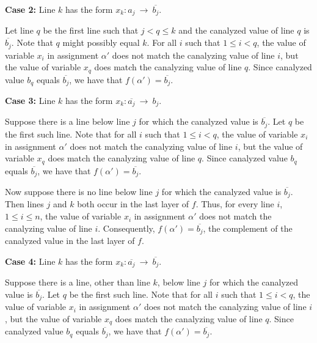 \medskip

\noindent
{\bf Case 2:} Line $k$ has the form  $x_k : a_j ~\longrightarrow~ \overline{b_j}$.  

\smallskip

Let line $q$ be the first line such that $j < q \leq k$ and the canalyzed
value of line $q$ is $\overline{b_j}$.  Note that $q$ might possibly
equal $k$.  For all $i$ such that $1 \leq i < q$, the value of
variable $x_i$ in assignment $\alpha'$ does not match the canalyzing
value of line $i$, but the value of variable $x_q$ does match the
canalyzing value of line $q$.  Since canalyzed value $b_q$ equals
$\overline{b_j}$, we have that $f(\alpha') = \overline{b_j}$.

\medskip

\noindent
{\bf Case 3:} Line $k$ has the form $x_k : \overline{a_j} ~\longrightarrow~ b_j$.  

\smallskip

Suppose there is a line below line $j$ for which the canalyzed value is
$\overline{b_j}$.  Let $q$ be the first such line.  Note that for
all $i$ such that $1 \leq i < q$, the value of variable $x_i$ in
assignment $\alpha'$ does not match the canalyzing value of line
$i$, but the value of variable $x_q$ does match the canalyzing value
of line $q$.  Since canalyzed value $b_q$ equals $\overline{b_j}$,
we have that $f(\alpha') = \overline{b_j}$.

\smallskip

Now suppose there is no line below line $j$ for which the canalyzed
value is $\overline{b_j}$.  Then lines $j$ and $k$ both occur in
the last layer of $f$.  Thus, for every line $i$, $1 \leq i \leq
n$, the value of variable $x_i$ in assignment $\alpha'$ does not
match the canalyzing value of line $i$.  Consequently, $f(\alpha')
= \overline{b_j}$, the complement of the canalyzed value in the
last layer of $f$.

\medskip

\noindent
{\bf Case 4:} Line $k$ has the form  $x_k : \overline{a_j} ~\longrightarrow~ \overline{b_j}$. 

\smallskip

Suppose there is a line, other than line $k$, below line $j$ for
which the canalyzed value is $\overline{b_j}$.  Let $q$ be the
first such line.  Note that for all $i$ such that $1 \leq i < q$,
the value of variable $x_i$ in assignment $\alpha'$ does not match
the canalyzing value of line $i$, but the value of variable $x_q$
does match the canalyzing value of line $q$.  Since canalyzed value
$b_q$ equals $\overline{b_j}$, we have that $f(\alpha') =
\overline{b_j}$.


